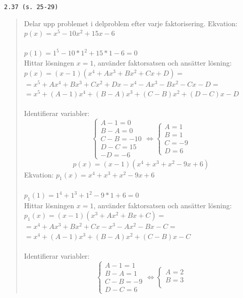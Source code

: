 \documentclass[a4paper]{article}
\newcommand{\tskcol}[1]{\textcolor{tskcol}{#1}}
\begin{document}
	\texttt{\tskcol{2.37 (s. 25-29)}}
	\begin{quotation}
		\noindent
		Delar upp problemet i delproblem efter varje faktorisering.
		Ekvation: $p(x)=x^5-10x^2+15x-6$ \\ \\
		$p(1)=1^5-10*1^2+15*1-6=0$ \\
		Hittar lösningen $x=1$, använder faktorsatsen och ansätter lösning: \\
		$p(x)=(x-1)(x^4+Ax^3+Bx^2+Cx+D)=$ \\
		$=x^5+Ax^4+Bx^3+Cx^2+Dx-x^4-Ax^3-Bx^2-Cx-D=$ \\
		$=x^5+(A-1)x^4+(B-A)x^3+(C-B)x^2+(D-C)x-D$ \\ \\
		Identifierar variabler: \\
		\[\begin{cases} 
		A-1=0 \\ 
		B-A=0 \\ 
		C-B=-10 \\
		D-C=15 \\
		-D=-6
		\end{cases}
		\Leftrightarrow
		\begin{cases} 
		A=1 \\ 
		B=1 \\
		C=-9 \\
		D=6
		\end{cases}\]
		\[p(x)=(x-1)(x^4+x^3+x^2-9x+6)\]
		Ekvation: $p_1(x)=x^4+x^3+x^2-9x+6$ \\ \\
		$p_1(1)=1^4+1^3+1^2-9*1+6=0$ \\
		Hittar lösningen $x=1$, använder faktorsatsen och ansätter lösning: \\
		$p_1(x)=(x-1)(x^3+Ax^2+Bx+C)=$ \\
		$=x^4+Ax^3+Bx^2+Cx-x^3-Ax^2-Bx-C=$ \\
		$=x^4+(A-1)x^3+(B-A)x^2+(C-B)x-C$ \\ \\
		Identifierar variabler: \\
		\[\begin{cases} 
		A-1=1 \\ 
		B-A=1 \\ 
		C-B=-9 \\
		D-C=6
		\end{cases}
		\Leftrightarrow
		\begin{cases} 
		A=2 \\ 
		B=3 \\

\end{cases}\]
\end{quotation}
\end{document}
